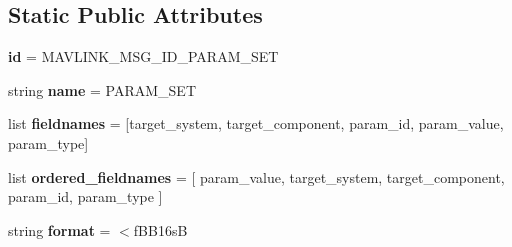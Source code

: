 \subsection*{Static Public Attributes}
\begin{DoxyCompactItemize}
\item 
\mbox{\label{classpymavlink_1_1dialects_1_1v10_1_1MAVLink__param__set__message_a1dab1f25ba6f98fe58c83a36833846a1}} 
{\bfseries id} = M\+A\+V\+L\+I\+N\+K\+\_\+\+M\+S\+G\+\_\+\+I\+D\+\_\+\+P\+A\+R\+A\+M\+\_\+\+S\+ET
\item 
\mbox{\label{classpymavlink_1_1dialects_1_1v10_1_1MAVLink__param__set__message_a037cd397738a3c6a02c5e317d33ec19d}} 
string {\bfseries name} = \textquotesingle{}P\+A\+R\+A\+M\+\_\+\+S\+ET\textquotesingle{}
\item 
\mbox{\label{classpymavlink_1_1dialects_1_1v10_1_1MAVLink__param__set__message_a0fcb51c0df590d30b5a5559a4479dbc5}} 
list {\bfseries fieldnames} = \mbox{[}\textquotesingle{}target\+\_\+system\textquotesingle{}, \textquotesingle{}target\+\_\+component\textquotesingle{}, \textquotesingle{}param\+\_\+id\textquotesingle{}, \textquotesingle{}param\+\_\+value\textquotesingle{}, \textquotesingle{}param\+\_\+type\textquotesingle{}\mbox{]}
\item 
\mbox{\label{classpymavlink_1_1dialects_1_1v10_1_1MAVLink__param__set__message_afc3a0274c3878196adde1e2bc7bd257b}} 
list {\bfseries ordered\+\_\+fieldnames} = \mbox{[} \textquotesingle{}param\+\_\+value\textquotesingle{}, \textquotesingle{}target\+\_\+system\textquotesingle{}, \textquotesingle{}target\+\_\+component\textquotesingle{}, \textquotesingle{}param\+\_\+id\textquotesingle{}, \textquotesingle{}param\+\_\+type\textquotesingle{} \mbox{]}
\item 
\mbox{\label{classpymavlink_1_1dialects_1_1v10_1_1MAVLink__param__set__message_aa81061774f0c8088fadfab8119a9be1c}} 
string {\bfseries format} = \textquotesingle{}$<$f\+B\+B16sB\textquotesingle{}
\item 

\end{DoxyCompactItemize}
